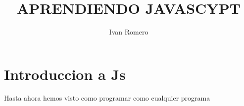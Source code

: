 \documentclass[12pt,letterpaper]{article}
\author{Ivan Romero}
\begin{document}
\title{APRENDIENDO JAVASCYPT}
\section{Introduccion a Js}
\label{introduccion}
Hasta ahora hemos visto como programar como cualquier programa 
\end{document}
